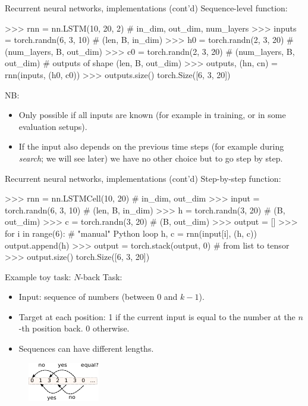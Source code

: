 \begin{frame}[fragile]{Recurrent neural networks, implementations (cont'd)}
Sequence-level function:
\begin{python}
>>> rnn = nn.LSTM(10, 20, 2)  # in_dim, out_dim, num_layers
>>> inputs = torch.randn(6, 3, 10)  # (len, B, in_dim)
>>> h0 = torch.randn(2, 3, 20)  # (num_layers, B, out_dim)
>>> c0 = torch.randn(2, 3, 20)  # (num_layers, B, out_dim)
# outputs of shape (len, B, out_dim)
>>> outputs, (hn, cn) = rnn(inputs, (h0, c0))
>>> outputs.size()
torch.Size([6, 3, 20])
\end{python}
NB:
\begin{itemize}
\item Only possible if all inputs are known (for example in training, or in some evaluation setups).
\item If the input also depends on the previous time steps (for example during \textit{search}; we will see later)
we have no other choice but to go step by step.
\end{itemize}
\end{frame}

\begin{frame}[fragile]{Recurrent neural networks, implementations (cont'd)}
Step-by-step function:
\begin{python}
>>> rnn = nn.LSTMCell(10, 20)  # in_dim, out_dim
>>> input = torch.randn(6, 3, 10)  # (len, B, in_dim)
>>> h = torch.randn(3, 20)  # (B, out_dim)
>>> c = torch.randn(3, 20)  # (B, out_dim)
>>> output = []
>>> for i in range(6):  # "manual" Python loop
        h, c = rnn(input[i], (h, c))
        output.append(h)
>>> output = torch.stack(output, 0)  # from list to tensor
>>> output.size()
torch.Size([6, 3, 20])
\end{python}
\end{frame}


\begin{frame}[fragile]{Example toy task: $N$-back}
Task:
\begin{itemize}
\item Input: sequence of numbers (between 0 and $k-1$).
\item Target at each position: 1 if the current input is equal
to the number at the $n$-th position back. 0 otherwise.
\item Sequences can have different lengths.
\end{itemize}
\vsp
\begin{figure}
                        \centering
                        \includegraphics[width=.4\linewidth]{./figures/nback.pdf}
\end{figure}
\end{frame}

